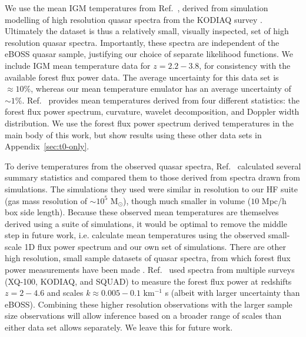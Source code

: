 We use the mean IGM temperatures from Ref.~\cite{2021MNRAS.506.4389G}, derived from simulation modelling of high resolution quasar spectra from the KODIAQ survey \cite{2017AJ....154..114O}. Ultimately the dataset is thus a relatively small, visually inspected, set of high resolution quasar spectra. Importantly, these spectra are independent of the eBOSS quasar sample, justifying our choice of separate likelihood functions. We include IGM mean temperature data for $z=2.2-3.8$, for consistency with the available \lya forest flux power data. The average uncertainty for this data set is $\approx10\%$, whereas our mean temperature emulator has an average uncertainty of $\sim 1\%$.
Ref.~\cite{2021MNRAS.506.4389G} provides mean temperatures derived from four different statistics: the \lya forest flux power spectrum, curvature, wavelet decomposition, and Doppler width distribution.
We use the \lya forest flux power spectrum derived temperatures in the main body of this work, but show results using these other data sets in Appendix~\ref{sec:t0-only}.

To derive temperatures from the observed quasar spectra, Ref.~\cite{2021MNRAS.506.4389G} calculated several summary statistics and compared them to those derived from spectra drawn from simulations.
The simulations they used were similar in resolution to our HF suite (gas mass resolution of $\sim10^5$ M$_{\odot}$), though much smaller in volume ($10$ Mpc/h box side length). Because these observed mean temperatures are themselves derived using a suite of simulations, it would be optimal to remove the middle step in future work, i.e. calculate mean temperatures using the observed small-scale 1D flux power spectrum and our own set of simulations. There are other high resolution, small sample datasets of quasar spectra, from which \lya forest flux power measurements have been made \cite{2017MNRAS.466.4332I, 2022MNRAS.509.2842K, 2019MNRAS.489.2536D}. Ref.~\cite{2022MNRAS.509.2842K} used spectra from multiple surveys (XQ-100, KODIAQ, and SQUAD) to measure the \lya forest flux power at redshifts $z=2-4.6$ and scales $k\approx0.005-0.1$ km$^{-1}$ s (albeit with larger uncertainty than eBOSS).
Combining these higher resolution observations with the larger sample size observations will allow inference based on a broader range of scales than either data set allows separately. We leave this for future work.

